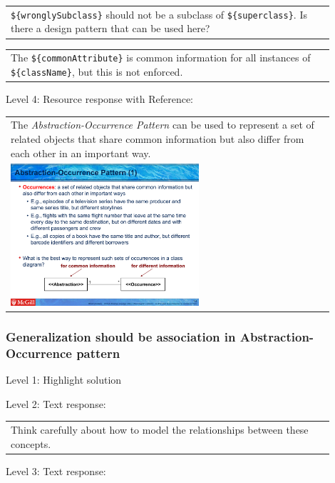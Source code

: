 \begin{tabular}{|p{0.9\linewidth}}
\verb|${wronglySubclass}| should not be a subclass of \verb|${superclass}|. Is there a design pattern that can be used here?
\end{tabular} \medskip

\begin{tabular}{|p{0.9\linewidth}}
The \verb|${commonAttribute}| is common information for all instances of \verb|${className}|, but this is not enforced.
\end{tabular} \medskip

\noindent Level 4: Resource response with Reference: \medskip

\begin{tabular}{|p{0.9\linewidth}}
The \textit{Abstraction-Occurrence Pattern} can be used to 
represent a set of related objects that share common information but also differ
from each other in an important way.

\\
\includegraphics[width=0.6\textwidth]{images/abstraction_occurrence.png}
\end{tabular} \medskip


\subsubsection{Generalization should be association in Abstraction-Occurrence pattern}

\noindent Level 1: Highlight solution  \medskip

\noindent Level 2: Text response: \medskip

\begin{tabular}{|p{0.9\linewidth}}
Think carefully about how to model the relationships between these concepts.
\end{tabular} \medskip

\noindent Level 3: Text response: \medskip

